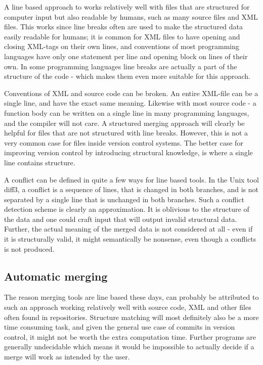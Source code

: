 \documentclass[11pt]{article}
\begin{document}
A line based approach to works relatively well with files that are structured for computer input but also readable by humans, such as many source files and XML files. This works since line breaks often are used to make the structured data easily readable for humans; it is common for XML files to have opening and closing XML-tags on their own lines, and conventions of most programming languages have only one statement per line and opening block on lines of their own. In some programming languages line breaks are actually a part of the structure of the code - which makes them even more suitable for this approach.

Conventions of XML and source code can be broken. An entire XML-file can be a single line, and have the exact same meaning. Likewise with most source code - a function body can be written on a single line in many programming languages, and the compiler will not care. A structured merging approach will clearly be helpful for files that are not structured with line breaks. However, this is not a very common case for files inside version control systems. The better case for improving version control by introducing structural knowledge, is where a single line contains structure.


A conflict can be defined in quite a few ways for line based tools. In the Unix tool diff3, a conflict is a sequence of lines, that is changed in both branches, and is not separated by a single line that is unchanged in both branches. Such a conflict detection scheme is clearly an approximation. It is oblivious to the structure of the data and one could craft input that will output invalid structural data. Further, the  actual meaning of the merged data is not considered at all - even if it is structurally valid, it might semantically be nonsense, even though a conflicts is not produced.

\subsection{Automatic merging}
The reason merging tools are line based these days, can probably be attributed to such an approach working relatively well with source code, XML and other files often found in repositories. Structure matching will most definitely also be a more time consuming task, and given the general use case of commits in version control, it might not be worth the extra computation time. Further programs are generally undecidable which means it would be impossible to actually decide if a merge will work as intended by the user.
\end{document}
